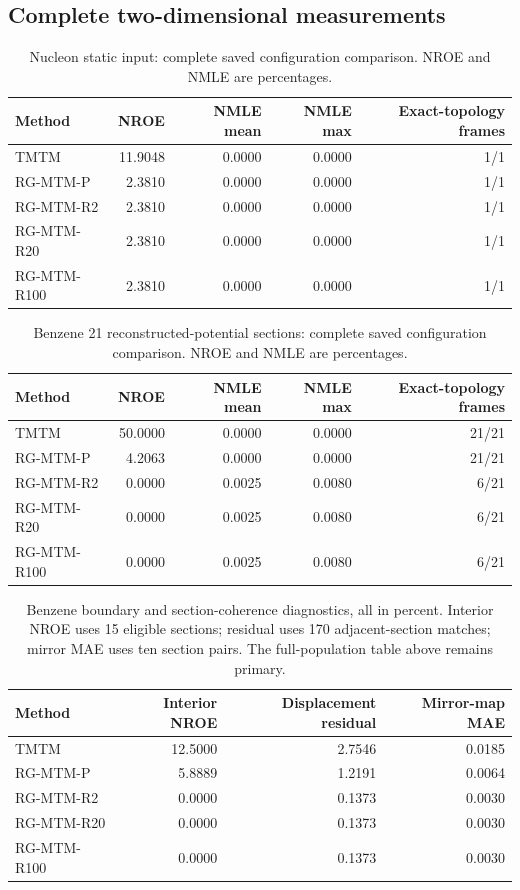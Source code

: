 \subsection{Complete two-dimensional measurements}
\begin{table}[H]\centering\small
\caption{Nucleon static input: complete saved configuration comparison. NROE and NMLE are percentages.}
\begin{tabular}{lrrrr}\toprule Method & NROE & NMLE mean & NMLE max & Exact-topology frames\\\midrule
TMTM & 11.9048 & 0.0000 & 0.0000 & 1/1\\
RG-MTM-P & 2.3810 & 0.0000 & 0.0000 & 1/1\\
RG-MTM-R2 & 2.3810 & 0.0000 & 0.0000 & 1/1\\
RG-MTM-R20 & 2.3810 & 0.0000 & 0.0000 & 1/1\\
RG-MTM-R100 & 2.3810 & 0.0000 & 0.0000 & 1/1\\
\bottomrule\end{tabular}\end{table}

\begin{table}[H]\centering\small
\caption{Benzene 21 reconstructed-potential sections: complete saved configuration comparison. NROE and NMLE are percentages.}
\begin{tabular}{lrrrr}\toprule Method & NROE & NMLE mean & NMLE max & Exact-topology frames\\\midrule
TMTM & 50.0000 & 0.0000 & 0.0000 & 21/21\\
RG-MTM-P & 4.2063 & 0.0000 & 0.0000 & 21/21\\
RG-MTM-R2 & 0.0000 & 0.0025 & 0.0080 & 6/21\\
RG-MTM-R20 & 0.0000 & 0.0025 & 0.0080 & 6/21\\
RG-MTM-R100 & 0.0000 & 0.0025 & 0.0080 & 6/21\\
\bottomrule\end{tabular}\end{table}

\begin{table}[H]\centering\small
\caption{Benzene boundary and section-coherence diagnostics, all in percent. Interior NROE uses 15 eligible sections; residual uses 170 adjacent-section matches; mirror MAE uses ten section pairs. The full-population table above remains primary.}
\begin{tabular}{lrrr}\toprule Method & Interior NROE & Displacement residual & Mirror-map MAE\\\midrule
TMTM & 12.5000 & 2.7546 & 0.0185\\
RG-MTM-P & 5.8889 & 1.2191 & 0.0064\\
RG-MTM-R2 & 0.0000 & 0.1373 & 0.0030\\
RG-MTM-R20 & 0.0000 & 0.1373 & 0.0030\\
RG-MTM-R100 & 0.0000 & 0.1373 & 0.0030\\
\bottomrule\end{tabular}\end{table}

